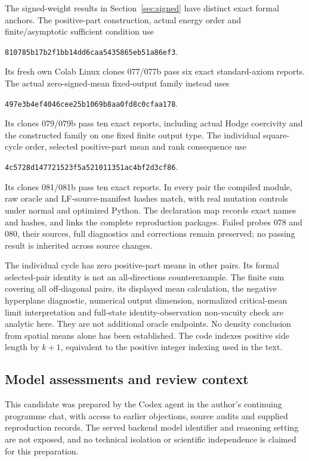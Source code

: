 \documentclass[11pt]{article}
\begin{document}
The signed-weight results in Section~\ref{sec:signed} have distinct exact
formal anchors. The positive-part construction, actual energy order and
finite/asymptotic sufficient condition use
\begin{center}\small\texttt{810785b17b2f1bb14dd6caa5435865eb51a86ef3}.\end{center}
Its fresh own Colab Linux clones 077/077b pass six exact standard-axiom
reports. The actual zero-signed-mean fixed-output family instead uses
\begin{center}\small\texttt{497e3b4ef4046cee25b1069b8aa0fd8c0cfaa178}.\end{center}
Its clones 079/079b pass ten exact reports, including actual Hodge coercivity
and the constructed family on one fixed finite output type. The individual
square-cycle order, selected positive-part mean and rank consequence use
\begin{center}\small\texttt{4c5728d147721523f5a521011351ac4bf2d3cf86}.\end{center}
Its clones 081/081b pass ten exact reports. In every pair the compiled
module, raw oracle and LF-source-manifest hashes match, with real mutation
controls under normal and optimized Python. The declaration map records
exact names and hashes, and links the complete reproduction packages.
Failed probes 078 and 080, their sources, full diagnostics and corrections
remain preserved; no passing result is inherited across source changes.

The individual cycle has zero positive-part means in other pairs. Its
formal selected-pair identity is not an all-directions counterexample.
The finite sum covering all off-diagonal pairs, its displayed mean calculation,
the negative hyperplane diagnostic, numerical output dimension, normalized
critical-mean limit interpretation and full-state identity-observation
non-vacuity check are analytic here. They are not additional oracle endpoints.
No density conclusion from spatial means alone has been established.
The code indexes positive side length by $k+1$, equivalent to the positive
integer indexing used in the text.

\bigskip
\subsection*{Model assessments and review context}
This candidate was prepared by the Codex agent in the author's continuing
programme chat, with access to earlier objections, source audits and supplied
reproduction records. The served backend model identifier and reasoning
setting are not exposed, and no technical isolation or scientific independence
is claimed for this preparation.
\end{document}
